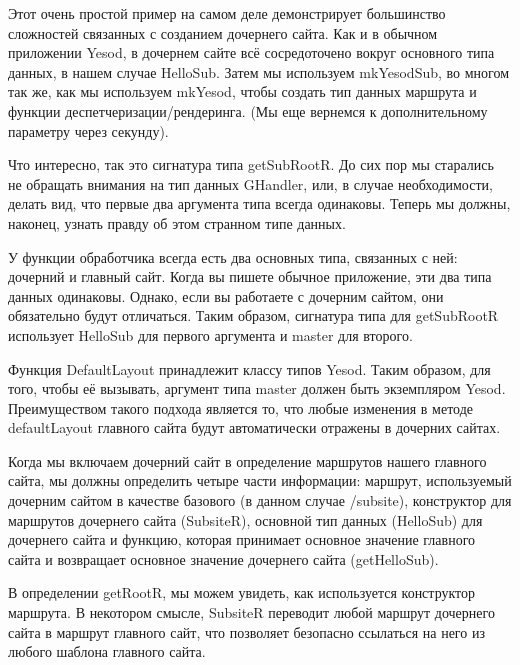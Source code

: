 Этот очень простой пример на самом деле демонстрирует большинство сложностей связанных с созданием дочернего сайта. Как и в обычном приложении Yesod, в дочернем сайте всё сосредоточено вокруг основного типа данных, в нашем случае HelloSub. Затем мы используем mkYesodSub, во многом так же, как мы используем mkYesod, чтобы создать тип данных маршрута и функции деспетчеризации/рендеринга. (Мы еще вернемся к дополнительному параметру через секунду).

Что интересно, так это сигнатура типа getSubRootR. До сих пор мы старались не обращать внимания на тип данных GHandler, или, в случае необходимости, делать вид, что первые два аргумента типа всегда одинаковы. Теперь мы должны, наконец, узнать правду об этом странном типе данных.

У функции обработчика всегда есть два основных типа, связанных с ней: дочерний и главный сайт. Когда вы пишете обычное приложение, эти два типа данных одинаковы. Однако, если вы работаете с дочерним сайтом, они обязательно будут отличаться. Таким образом, сигнатура типа для getSubRootR использует HelloSub для первого аргумента и master для второго.

Функция DefaultLayout принадлежит классу типов Yesod. Таким образом, для того, чтобы её вызывать, аргумент типа master должен быть экземпляром Yesod. Преимуществом такого подхода является то, что любые изменения в методе defaultLayout главного сайта будут автоматически отражены в дочерних сайтах.

Когда мы включаем дочерний сайт в определение маршрутов нашего главного сайта, мы должны определить четыре части информации: маршрут, используемый дочерним сайтом в качестве базового (в данном случае /subsite), конструктор для маршрутов дочернего сайта (SubsiteR), основной тип данных (HelloSub) для дочернего сайта и функцию, которая принимает основное значение главного сайта и возвращает основное значение дочернего сайта (getHelloSub).

В определении getRootR, мы можем увидеть, как используется конструктор маршрута. В некотором смысле, SubsiteR переводит любой маршрут дочернего сайта в маршрут главного сайт, что позволяет безопасно ссылаться на него из любого шаблона главного сайта.
